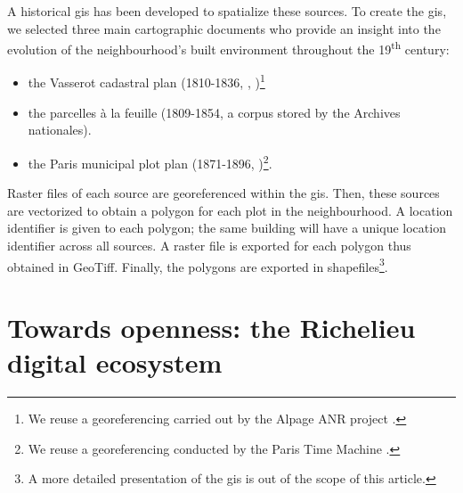 \documentclass[12pt, a4paper, twocolumn]{article}
\begin{document}
A historical \ac{gis} has been developed to spatialize these sources. To create the \ac{gis}, we selected three main cartographic documents who provide an insight into the evolution of the neighbourhood's built environment throughout the 19\textsuperscript{th} century:
\begin{itemize}
    \item the Vasserot cadastral plan (1810-1836, \cite{souchonPhilibertVasserot177318402008}, \cite{noizet:halshs-00419684})\footnote{We reuse a georeferencing carried out by the Alpage ANR project \parencite{costaAtlasVasserot181018362023}.}
    \item the parcelles à la feuille (1809-1854, a corpus stored by the Archives nationales).
    \item the Paris municipal plot plan (1871-1896, \cite{dumasRepresentationDescriptionProprietes1999} \cite{balPlanParcellaireVille2000})\footnote{We reuse a georeferencing conducted by the Paris Time Machine \parencite{costaPlan1900Draps2023}.}.
\end{itemize}

Raster files of each source are georeferenced within the \ac{gis}. Then, these sources are vectorized to obtain a polygon for each plot in the neighbourhood. A location identifier is given to each polygon; the same building will have a unique location identifier across all sources. A raster file is exported for each polygon thus obtained in GeoTiff. Finally, the polygons are exported in shapefiles\footnote{A more detailed presentation of the \ac{gis} is out of the scope of this article.}.

\section{Towards openness: the Richelieu digital ecosystem}
\end{document}
